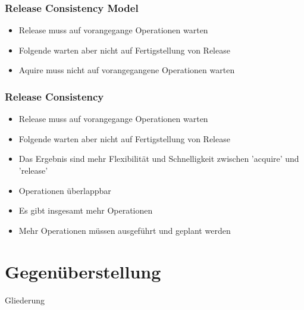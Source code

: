 \documentclass{sikslides}
\begin{document}
\begin{frame}
	\frametitle{Release Consistency Model}
	\begin{itemize}

		\item Release muss auf vorangegange Operationen warten \bigskip 
		\item Folgende warten aber nicht auf Fertigstellung von Release \bigskip
		\item Aquire muss nicht auf vorangegangene Operationen warten


		

	\end{itemize}


\end{frame}

\begin{frame}
	\frametitle{Release Consistency}
	\begin{itemize}

		\item Release muss auf vorangegange Operationen warten \bigskip
		\item Folgende warten aber nicht auf Fertigstellung von Release \bigskip
		\item Das Ergebnis sind mehr Flexibilität und Schnelligkeit zwischen ’acquire’ und ’release’ \bigskip
		\item Operationen überlappbar \bigskip
		\item Es gibt insgesamt mehr Operationen  \bigskip
		\item Mehr Operationen müssen ausgeführt und geplant werden 

		

	\end{itemize}


\end{frame}




\section{Gegenüberstellung}
\begin{frame}{Gliederung}
   
    	\tableofcontents[currentsection, subsectionstyle=show/show/hide]
\end{frame}
\end{document}
